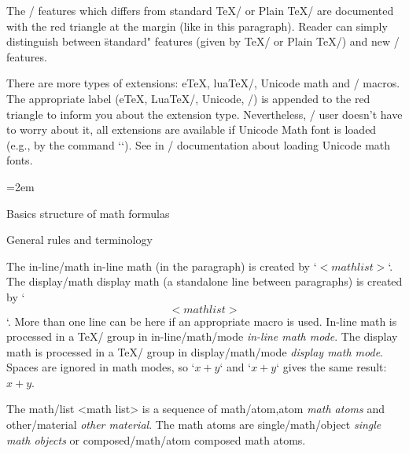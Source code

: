 \new {}
The \OpTeX/ features which differs from standard \TeX/ or Plain \TeX/ are
documented with the red triangle at the margin (like in this paragraph).
Reader can simply distinguish between \"standard" features (given by
\TeX/ or Plain \TeX/) and new \OpTeX/ features.

There are more types of extensions: e\TeX, lua\TeX/, Unicode math and
\OpTeX/ macros. The appropriate label (e\TeX, Lua\TeX/, Unicode, \OpTeX/)
is appended to the red triangle to inform you about the extension type.
Nevertheless, \OpTeX/ user doesn't have to worry about it, all extensions
are available if Unicode Math font is loaded (e.g., by the command
`\fonfam[lmfonts]`). See  in \OpTeX/
documentation about loading Unicode math fonts.

{\iindent=2em
\bigskip
\maketoc }
\vfil\break

\sec Basics structure of math formulas

\secc General rules and terminology

The \ii in-line/math in-line math (in the paragraph) is created by `$<math list>$`. The
\ii display/math display math (a standalone line between paragraphs) is created by `$$<math list>$$`.
More than one line can be here if an appropriate macro is used. In-line math is
processed in a \TeX/ group in \ii in-line/math/mode {\em in-line math mode}. The display math is
processed in a \TeX/ group in \ii display/math/mode {\em display math mode}. Spaces are
ignored in math modes, so `$x+y$` and `$x + y$` gives the same result: $x+y$.

The \ii math/list <math list> is a sequence of \ii math/atom,atom {\em math atoms} and
\ii other/material {\em other material}.
The math atoms are \ii single/math/object {\em single math objects} or
\ii composed/math/atom composed math atoms.

